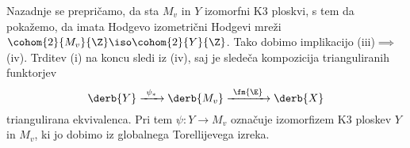 \begin{dokaz}
    Nazadnje se prepričamo, da sta $M_v$ in $Y$ izomorfni K3 ploskvi, s tem da pokažemo, da imata Hodgevo izometrični Hodgevi mreži $\cohom{2}{M_v}{\Z} \iso \cohom{2}{Y}{\Z}$. Tako dobimo implikacijo (iii)$\implies$(iv). Trditev (i) na koncu sledi iz (iv), saj je sledeča kompozicija trianguliranih funktorjev  
    \[
        \derb{Y} \xrightarrow{ \ \psi_* \ } \derb{M_v} \xrightarrow{ \ \fm{\E} \ } \derb{X}
    \]
    triangulirana ekvivalenca. Pri tem $\psi \colon Y \to M_v$ označuje izomorfizem K3 ploskev $Y$ in $M_v$, ki jo dobimo iz globalnega Torellijevega izreka. 
\end{dokaz}